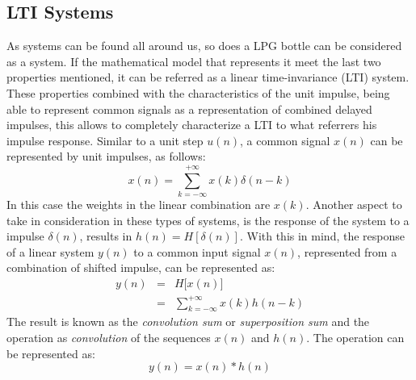\subsection{LTI Systems} \label{subsec:LTI}
As systems can be found all around us, so does a LPG bottle can be considered as a system. If the mathematical model that represents it meet the last two properties mentioned, it can be referred as a linear time-invariance (LTI) system. These properties combined with the characteristics of the unit impulse, being able to represent common signals as a representation of combined delayed impulses, this allows to completely characterize a LTI to what referrers his impulse response\cite{oppenheimSignalsSystems1997}\cite{haykin1999signals}.
Similar to a unit step $u(n)$, a common signal $x(n)$ can be represented by unit impulses, as follows:
\begin{equation}
    x(n) = \sum_{k=-\infty}^{+\infty} x(k)\delta(n-k)
\end{equation}
In this case the weights in the linear combination are $x(k)$. Another aspect to take in consideration in these types of systems, is the response of the system to a impulse $\delta(n)$, results in $h(n) = H[\delta(n)]$. With this in mind, the response of a linear system $y(n)$ to a common input signal $x(n)$, represented from a combination of shifted impulse, can be represented as:
\begin{equation}
    \begin{matrix}
        y(n) & = & H\big[x(n)\big] \\
        \ & = & \sum_{k=-\infty}^{+\infty} x(k)h(n-k)
    \end{matrix}
\end{equation}
The result is known as the \textit{convolution sum} or \textit{superposition sum} and the operation as \textit{convolution} of the sequences $x(n)$ and $h(n)$. The operation can be represented as:
\begin{equation}
    y(n) = x(n) * h(n)
\end{equation} 

